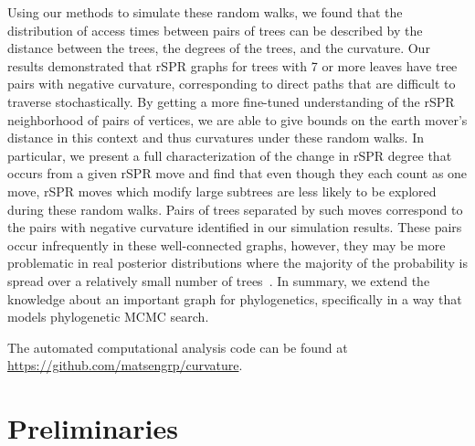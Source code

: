 \documentclass[]{elsarticle}
\begin{document}
Using our methods to simulate these random walks, we found that the distribution of access times between pairs of trees can be described by the distance between the trees, the degrees of the trees, and the curvature.
Our results demonstrated that rSPR graphs for trees with 7 or more leaves have tree pairs with negative curvature, corresponding to direct paths that are difficult to traverse stochastically.
By getting a more fine-tuned understanding of the rSPR neighborhood of pairs of vertices, we are able to give bounds on the earth mover's distance in this context and thus curvatures under these random walks.
In particular, we present a full characterization of the change in rSPR degree that occurs from a given rSPR move and find that even though they each count as one move, rSPR moves which modify large subtrees are less likely to be explored during these random walks.
Pairs of trees separated by such moves correspond to the pairs with negative curvature identified in our simulation results.
These pairs occur infrequently in these well-connected graphs, however, they may be more problematic in real posterior distributions where the majority of the probability is spread over a relatively small number of trees~\citep{Whidden2015-yi}.
In summary, we extend the knowledge about an important graph for phylogenetics, specifically in a way that models phylogenetic MCMC search.

The automated computational analysis code can be found at \url{https://github.com/matsengrp/curvature}.

\section{Preliminaries}
\end{document}
